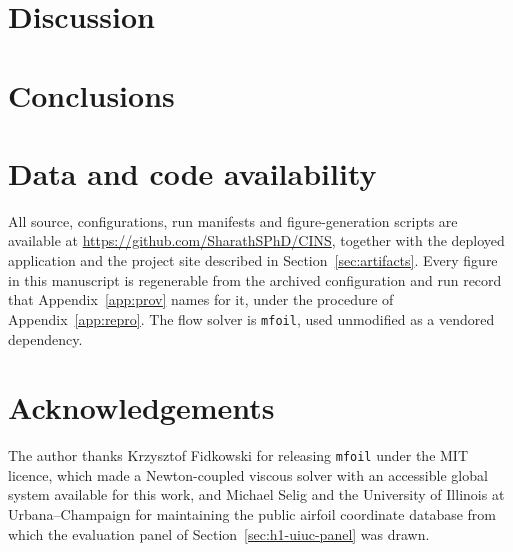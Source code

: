 \documentclass[11pt]{article}
\begin{document}
\section{Discussion}
\label{sec:discussion}


\section{Conclusions}
\label{sec:conclusions}


\section*{Data and code availability}
All source, configurations, run manifests and figure-generation scripts are
available at \url{https://github.com/SharathSPhD/CINS}, together with the
deployed application and the project site described in
Section~\ref{sec:artifacts}. Every figure in this manuscript is regenerable
from the archived configuration and run record that Appendix~\ref{app:prov}
names for it, under the procedure of Appendix~\ref{app:repro}. The flow
solver is \texttt{mfoil}, used unmodified as a vendored dependency.

\section*{Acknowledgements}
The author thanks Krzysztof Fidkowski for releasing \texttt{mfoil} under the
MIT licence, which made a Newton-coupled viscous solver with an accessible
global system available for this work, and Michael Selig and the University
of Illinois at Urbana--Champaign for maintaining the public airfoil
coordinate database from which the evaluation panel of
Section~\ref{sec:h1-uiuc-panel} was drawn.

\appendix
\makeatletter
\renewcommand{\@seccntformat}[1]{Appendix~\csname the#1\endcsname.\quad}
\makeatother




\end{document}
